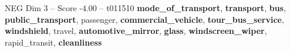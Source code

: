 \begin{textsample}{NEG Dim 3 – Score -4.00 – t011510}  \label{ex:f3_neg_040}
\textbf{mode\_of\_transport}, \textbf{transport}, \textbf{bus}, \textbf{public\_transport}, passenger, \textbf{commercial\_vehicle}, \textbf{tour\_bus\_service}, \textbf{windshield}, travel, \textbf{automotive\_mirror}, \textbf{glass}, \textbf{windscreen\_wiper}, rapid\_transit, \textbf{cleanliness}

\end{textsample}
